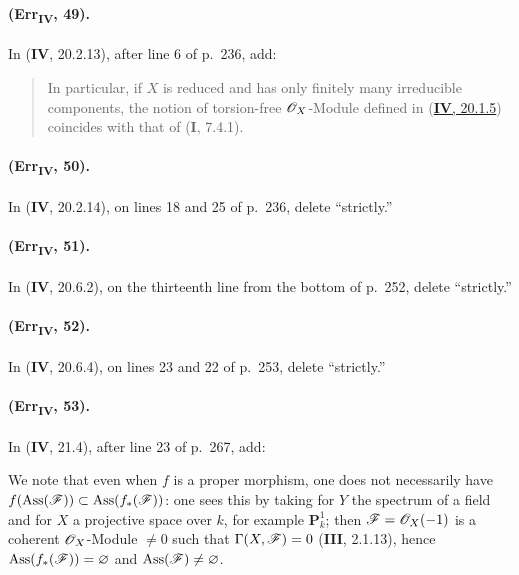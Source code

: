 {\paragraph{(Err\textsubscript{\textmd{IV}}, 49).}
In (\textbf{IV}, 20.2.13), after line 6 of p.~236, add:
\begin{quote}
In particular, if $X$ is reduced and has only finitely many irreducible
components, the notion of torsion-free $\mathscr{O}_X$-Module defined in
({\hyperref[IV.20]{\textbf{IV}, 20.1.5}}) coincides with that of (\textbf{I}, 7.4.1).
\end{quote}

\paragraph{(Err\textsubscript{\textmd{IV}}, 50).}
In (\textbf{IV}, 20.2.14), on lines 18 and 25 of p.~236, delete ``strictly.''

\paragraph{(Err\textsubscript{\textmd{IV}}, 51).}
In (\textbf{IV}, 20.6.2), on the thirteenth line from the bottom of p.~252,
delete ``strictly.''

\paragraph{(Err\textsubscript{\textmd{IV}}, 52).}
In (\textbf{IV}, 20.6.4), on lines 23 and 22 of p.~253, delete ``strictly.''

\paragraph{(Err\textsubscript{\textmd{IV}}, 53).}
In (\textbf{IV}, 21.4), after line 23 of p.~267, add:

\def\EGAIVSuppressErratumLabels{1}

\let\EGAIVSuppressErratumLabels\undefined
}

\begin{env}[3.1.10.5]
\label{IV.3.1.10.5}
We note that even when $f$ is a proper morphism, one does not necessarily have
$f(\operatorname{Ass}(\mathscr{F}))\subset\operatorname{Ass}(f_*(\mathscr{F}))$:
one sees this by taking for $Y$ the spectrum of a field and for $X$ a
projective space over $k$, for example $\mathbf P^1_k$; then
$\mathscr{F}=\mathscr{O}_X(-1)$ is a coherent $\mathscr{O}_X$-Module $\neq0$ such
that $\Gamma(X,\mathscr{F})=0$ (\textbf{III}, 2.1.13), hence
$\operatorname{Ass}(f_*(\mathscr{F}))=\varnothing$ and
$\operatorname{Ass}(\mathscr{F})\neq\varnothing$.
\end{env}

